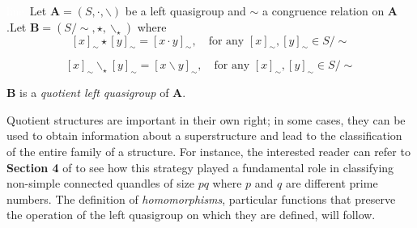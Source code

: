 \documentclass{mcom-l}
\begin{document}
\begin{definition} \cite{burris1981course}\label{quotientdef}\textcolor{white}{line}\newline\
Let $\mathbf{A}=(S,\cdot, \backslash)$ be a left quasigroup and $\sim$ a congruence relation on $\mathbf{A}$.\newline Let $\mathbf{B} = (S/\sim, \star, \backslash_\star)$ where 
\[[x]_\sim \star [y]_\sim = [x \cdot y]_\sim,\quad \text{for any }[x]_\sim,[y]_\sim \in S/\sim\]

\[[x]_\sim \backslash_\star [y]_\sim = [x \backslash y]_\sim,\quad \text{for any }[x]_\sim,[y]_\sim \in S/\sim\]

\noindent $\mathbf{B}$ is a \emph{quotient left quasigroup} of $\mathbf{A}$. 
\end{definition}
\noindent 
Quotient structures are important in their own right; in some cases, they can be used to obtain information about a superstructure and lead to the classification of the entire family of a structure. For instance, the interested reader can refer to \textbf{Section 4} of \cite{bonatto2022connected} to see how this strategy played a fundamental role in classifying non-simple connected quandles of size $pq$ where $p$ and $q$ are different prime numbers.\newline\newline
The definition of \emph{homomorphisms}, particular functions that preserve the operation of the left quasigroup on which they are defined, will follow.
\end{document}
